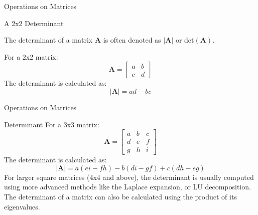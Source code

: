 \documentclass[aspectratio=169,xcolor=dvipsnames,svgnames,x11names,fleqn]{beamer}
\begin{document}
\begin{frame}[containsverbatim]{Operations on Matrices}


\begin{tblock}{A 2x2 Determinant}

The determinant of a matrix $\mathbf{A}$ is often denoted as $|\mathbf{A}|$ or $\text{det}(\mathbf{A})$.

For a 2x2 matrix:
$$
\mathbf{A} = \begin{bmatrix}
a & b \\
c & d
\end{bmatrix}
$$
The determinant is calculated as:
$$|\mathbf{A}| = ad - bc
$$
\end{tblock}

\end{frame}
\begin{frame}[containsverbatim]{Operations on Matrices}



\begin{tblock}{Determinant}
For a 3x3 matrix:
$$
\mathbf{A} = \begin{bmatrix}
a & b & c \\
d & e & f \\
g & h & i
\end{bmatrix}
$$
The determinant is calculated as:
$$|\mathbf{A}| = a(ei - fh) - b (di - gf) + c (dh - eg)
$$
For larger square matrices (4x4 and above), the determinant is usually computed using more advanced methods like the Laplace expansion, or LU decomposition. The determinant of a matrix can also be calculated using the product of its eigenvalues. 
\end{tblock}

\end{frame}
\end{document}
